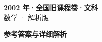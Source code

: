 \documentclass[zihao=-4, a4paper]{ctexart}
\begin{document}
\begin{center}
  {\Large\bfseries 2002 年·全国旧课程卷·文科}\\[4pt]
  {\large 数学 · 解析版}
\end{center}
\medskip
{}

\clearpage
{}
\begin{center}{\Large\bfseries 参考答案与详细解析}\end{center}
\medskip

\end{document}
